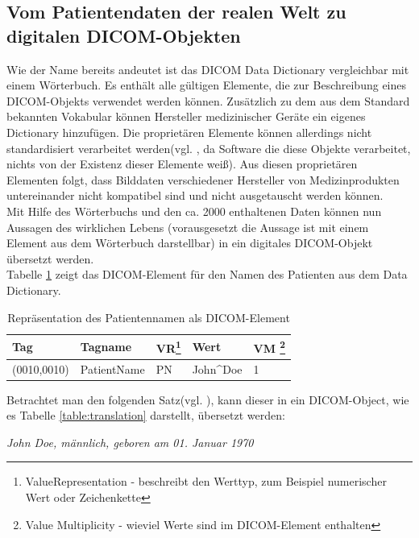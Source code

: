 \subsection{Vom Patientendaten der realen Welt zu digitalen DICOM-Objekten} \label{grundlagen:dicomObjects}
Wie der Name bereits andeutet ist das DICOM Data Dictionary vergleichbar mit einem Wörterbuch. Es enthält alle gültigen Elemente, die zur Beschreibung eines DICOM-Objekts verwendet werden können. Zusätzlich zu dem aus dem Standard bekannten Vokabular können Hersteller medizinischer Geräte ein eigenes Dictionary hinzufügen. Die proprietären Elemente können allerdings nicht standardisiert verarbeitet werden(vgl. \cite[S.45]{pianykh:dicom}, da Software die diese Objekte verarbeitet, nichts von der Existenz dieser Elemente weiß). Aus diesen proprietären Elementen folgt, dass Bilddaten verschiedener Hersteller von Medizinprodukten untereinander nicht kompatibel sind und nicht ausgetauscht werden können.\\
Mit Hilfe des Wörterbuchs und den ca. 2000 enthaltenen Daten können nun Aussagen des wirklichen Lebens (vorausgesetzt die Aussage ist mit einem Element aus dem Wörterbuch darstellbar) in ein digitales DICOM-Objekt übersetzt werden.\\
Tabelle \ref{table:patientname} zeigt das DICOM-Element für den Namen des Patienten aus dem Data Dictionary\cite[S. 14]{dicom:dd}.

\begin{table}
    \begin{tabularx}{\textwidth}{|X|X|X|X|X|}
    \toprule
    \hline
    \textbf{Tag}         & \textbf{Tagname}     & \textbf{VR\footnote{ValueRepresentation - beschreibt den Werttyp, zum Beispiel numerischer Wert oder Zeichenkette}} & \textbf{Wert}     	& \textbf{VM \footnote{Value Multiplicity - wieviel Werte sind im DICOM-Element enthalten}} \\ \hline
    (0010,0010) 		 & PatientName 			& PN 		  & John\^{}Doe 		& 1  \\  \hline
    \bottomrule
    \end{tabularx}
    \caption {Repräsentation des Patientennamen als DICOM-Element}
    \label{table:patientname}
\end{table}

Betrachtet man den folgenden Satz(vgl. \cite[S.46]{pianykh:dicom}), kann dieser in ein DICOM-Object, wie es Tabelle \ref*{table:translation} darstellt, übersetzt werden:
\begin{center}
\textit{\glqq John Doe, männlich, geboren am 01. Januar 1970\grqq}
\end{center}

